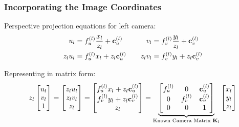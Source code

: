\begin{frame}
    \frametitle{Incorporating the Image Coordinates}
    Perspective projection equations for left camera:
    \begin{align*}
        u_l &= f_u^{(l)} \frac{x_l}{z_l} + \boldsymbol{\mathbf{c}}_{u}^{(l)} \quad & v_l &= f_v^{(l)} \frac{y_l}{z_l} + \boldsymbol{\mathbf{c}}_{v}^{(l)} \\
        z_l u_l &= f_u^{(l)} x_l + z_l \boldsymbol{\mathbf{c}}_{u}^{(l)} \quad & z_l v_l &= f_v^{(l)} y_l + z_l \boldsymbol{\mathbf{c}}_{v}^{(l)}
    \end{align*}

    Representing in matrix form:
    \begin{equation*}
        z_l \begin{bmatrix} u_l \\ v_l \\ 1 \end{bmatrix} =
        \begin{bmatrix}
            z_l u_l \\
            z_l v_l \\
            z_l
        \end{bmatrix} =
        \begin{bmatrix}
            f_u^{(l)} x_l + z_l \boldsymbol{\mathbf{c}}_{u}^{(l)} \\
            f_v^{(l)} y_l + z_l \boldsymbol{\mathbf{c}}_{v}^{(l)} \\
            z_l
        \end{bmatrix} =
        \underbrace{\begin{bmatrix}
            f_u^{(l)} & 0 & \boldsymbol{\mathbf{c}}_{u}^{(l)} \\
            0 & f_v^{(l)} & \boldsymbol{\mathbf{c}}_{v}^{(l)} \\
            0 & 0 & 1
        \end{bmatrix}}_{\text{Known Camera Matrix } \boldsymbol{\mathbf{K}}_l}
        \begin{bmatrix} x_l \\ y_l \\ z_l \end{bmatrix}
    \end{equation*}
\end{frame}

